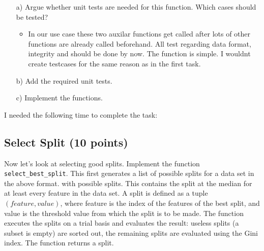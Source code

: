 \documentclass{article}
\begin{document}
\begin{enumerate}

\item[a)] Argue whether unit tests are needed for this function. Which cases should be tested?
\begin{itemize}
    \item In our use case these two auxilar functions get called after lots of other functions are already called beforehand.
    All test regarding data format, integrity and should be done by now. The function is simple. I wouldnt create testcases for the same reason as in the first task.
\end{itemize}

\item[b)] Add the required unit tests.

\item[c)] Implement the functions.

\end{enumerate}

I needed the following time to complete the task:

\subsection{Select Split (10 points)}

Now let's look at selecting good splits. Implement the function \texttt{select\_best\_split}. This first generates a list of possible splits for a data set in the above format.
with possible splits. This contains the split at the median for at least every feature in the data set. A split is defined as a tuple $( feature, value )$, where feature is the index of the
features of the best split, and value is the threshold value from which the split is to be made. The function executes the splits on a trial basis and evaluates the result: useless splits
(a subset is empty) are sorted out, the remaining splits are evaluated using the Gini index. The function returns a split. 
\end{document}
